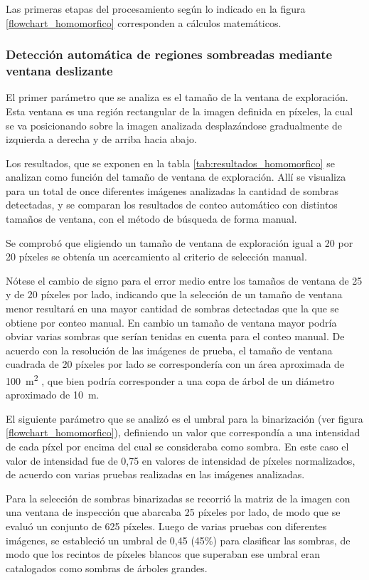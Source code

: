 Las primeras etapas del procesamiento según lo indicado en la figura \ref{flowchart_homomorfico} corresponden a cálculos matemáticos.
\subsubsection{Detección automática de regiones sombreadas mediante ventana deslizante} \label{resultados homo ventana}
El primer parámetro que se analiza es el tamaño de la ventana de exploración. Esta ventana es una región rectangular de la imagen definida en píxeles, la cual se va posicionando sobre la imagen analizada desplazándose gradualmente de izquierda a derecha y de arriba hacia abajo.

 Los resultados, que se exponen en la tabla \ref{tab:resultados_homomorfico} se analizan como función del tamaño de ventana de exploración.
Allí se visualiza para un total de once diferentes imágenes analizadas la cantidad de sombras detectadas, y se comparan los resultados de conteo automático con distintos tamaños de ventana, con el método de búsqueda de forma manual.

Se comprobó que eligiendo un tamaño de ventana de exploración igual a 20 por 20 píxeles se obtenía un acercamiento al criterio de selección manual.

Nótese el cambio de signo para el error medio entre los tamaños de ventana de 25 y de 20 píxeles por lado, indicando que la selección de un tamaño de ventana menor resultará en una mayor cantidad de sombras detectadas que la que se obtiene por conteo manual. En cambio un tamaño de ventana mayor podría obviar varias sombras que serían tenidas en cuenta para el conteo manual. De acuerdo con la resolución de las imágenes de prueba, el tamaño de ventana cuadrada de 20 píxeles por lado se correspondería con un área aproximada de \SI{100}{\metre\squared} , que bien podría corresponder a una copa de árbol de un diámetro aproximado de \SI{10}{\metre}.

El siguiente parámetro que se analizó es el umbral para la binarización (ver figura \ref{flowchart_homomorfico}), definiendo un valor que correspondía a una intensidad de cada píxel por encima del cual se consideraba como sombra. En este caso el valor de intensidad fue de 0,75 en valores de intensidad de píxeles normalizados, de acuerdo con varias pruebas realizadas en las imágenes analizadas.

Para la selección de sombras binarizadas se recorrió la matriz de la imagen con una ventana de inspección que abarcaba 25 píxeles por lado, de modo que se evaluó un conjunto de 625 píxeles. Luego de varias pruebas con diferentes imágenes, se estableció un umbral de 0,45 (45\%) para clasificar las sombras, de modo que los recintos de píxeles blancos que superaban ese umbral eran catalogados como sombras de árboles grandes.

